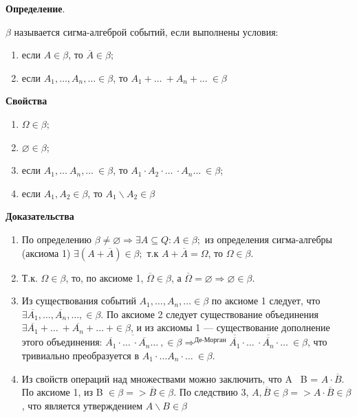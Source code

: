 \textbf{Определение}. 

$\beta$ называется сигма-алгеброй событий, если выполнены условия: 
\begin{enumerate}
	\item если $A \in \beta$, то $\overline{A} \in \beta$;
	\item если $A_1, \dots, A_n, \dots \in \beta$, то $A_1 + \dots\ + A_n + \dots\ \in \beta$
\end{enumerate}

\textbf{Свойства}

\begin{enumerate}
	
	\item $\Omega \in \beta$;
	\item $\varnothing \in \beta$;
	\item если $A_1, \dots\ A_n, \dots\ \in \beta$, то $A_1 \cdot A_2 \cdot \dots\ \cdot A_n \dots\  \in \beta$;
	\item если $A_1, A_2 \in \beta$, то $A_1 \backslash A_2 \in \beta$
\end{enumerate}


\textbf{Доказательства}

\begin{enumerate}
	\item По определению $\beta \neq \varnothing \Rightarrow \exists A \subseteq Q: A \in \beta;$ из определения сигма-алгебры (аксиома 1) $\exists (A + \overline{A}) \in \beta;$ т.к $A + \overline{A} = \Omega$, то $\Omega \in \beta$.
	\item Т.к. $\Omega \in \beta$, то, по аксиоме 1, $\overline{\Omega} \in \beta$, а $\overline{\Omega} = \varnothing \Rightarrow \varnothing \in \beta$. 
	\item Из существования событий $A_1, \dots, A_n, \dots \in \beta$ по аксиоме 1 следует, что $\exists \overline{A_1}, \dots, \overline{A_n}, \dots, \in \beta$. По аксиоме 2 следует существование объединения $\exists \overline{A_1} + \dots\ + \overline{A_n} +  \dots\ + \in \beta$, и из аксиомы 1 --- существование дополнение этого объединения: $\overline{\overline{A_1} \cdot \dots\ \cdot \overline{A_n} \dots\ }, \in \beta \Rightarrow^{\text{Де-Морган}} \overline{\overline{A_1}} \cdot \dots\ \cdot \overline{\overline{A_n}} \cdot \dots\  \in \beta$, что тривиально преобразуется в $A_1 \cdot \dots  A_n \cdot \dots\  \in \beta$.
	
	\item Из свойств операций над множествами можно заключить, что A \ B = $A \cdot \overline{B}.$ По аксиоме 1, из B $\in \beta => \overline{B} \in \beta$. По следствию 3, $A, \overline{B} \in \beta => A \cdot \overline{B} \in \beta$, что является утверждением $A \backslash B \in \beta$ 
\end{enumerate}


